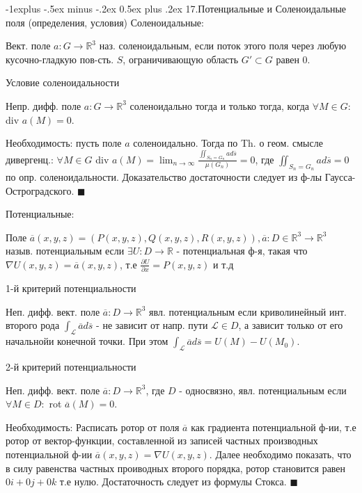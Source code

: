 \documentclass[unicode,10pt, landscape]{article}
\makeatletter
\renewcommand{\subsection}{\@startsection{subsection}{2}{0mm}%
                                {-1explus -.5ex minus -.2ex}%
                                {0.5ex plus .2ex}%
                                {\normalfont\normalsize\bfseries}}
\newenvironment{Proof} %
{\par\noindent{\bf Док-во:}} %
{\hfill$\scriptstyle\blacksquare$}
\makeatother
\begin{document}
\begin{multicols}{4}
 \subsection{17.Потенциальные и Соленоидальные поля (определения, условия)}
 Соленоидальные:
 \begin{Def}
  Вект. поле $a: G \to \mathbb{R}^3$ наз. соленоидальным, если поток этого поля через любую кусочно-гладкую пов-сть. $S$, ограничивающую область $G' \subset G$ равен 0.
 \end{Def}
 Условие соленоидальности
 \begin{Th}
  Непр. дифф. поле $a : G \to \mathbb{R}^3$ соленоидально тогда и только тогда, когда $\forall M \in G : $ div $a(M) = 0$.
  \begin{Proof}
   Необходимость: пусть поле $a$ соленоидально. Тогда по Th. о геом. смысле дивергенц.: $\forall M \in G $ div $a(M) = \lim_{n\to\infty}\frac{\iint_{S_n = G_n} ad\overline{s}}{\mu(G_n)} = 0$, где $\iint_{S_n = G_n} ad\overline{s} = 0$ по опр. соленоидальности.
   Доказательство достаточности следует из ф-лы Гаусса-Остроградского.
  \end{Proof}
 \end{Th}
 Потенциальные:
 \begin{Def}
  Поле $\overline{a}(x, y, z) = (P(x, y, z), Q(x, y, z), R(x, y, z)), \overline{a} : D \in \mathbb{R}^3 \to \mathbb{R}^3$ назыв. потенциальным если $\exists U: D \to \mathbb{R}$ - потенциальная ф-я, такая что $\nabla U(x, y, z) = \overline{a}(x, y, z)$, т.е $\frac{\partial U}{\partial x} = P(x, y, z)$ и т.д
 \end{Def}
 1-й критерий потенциальности
 \begin{Th}
  Неп. дифф. вект. поле $\overline{a}: D \to \mathbb{R}^3$ явл. потенциальным если криволинейный инт. второго рода $\int_{\mathcal{L}}\overline{a}d\overline{s}$ - не зависит от напр. пути $\mathcal{L} \in D$, а зависит только от его начальнойи конечной точки. При этом $\int_{\mathcal{L}}\overline{a}d\overline{s} = U(M) - U(M_0)$.
 \end{Th}
 2-й критерий потенциальности
 \begin{Th}
  Неп. дифф. вект. поле $\overline{a}: D \to \mathbb{R}^3$, где $D$ - односвязно, явл. потенциальным если $\forall M \in D: $ rot $\overline{a}(M) = 0$.
  \begin{Proof}
   Необходимость: Расписать ротор от поля $\overline{a}$ как градиента потенциальной ф-ии, т.е ротор от вектор-функции, составленной из записей частных производных потенциальной ф-ии $\overline{a}(x, y, z) = \nabla U(x, y, z)$. Далее необходимо показать, что в силу равенства частных проиводных второго порядка, ротор становится равен $0i + 0j + 0k$ т.е нулю.
   Достаточность следует из формулы Стокса.
  \end{Proof}
 \end{Th}

\end{multicols}
\end{document}
